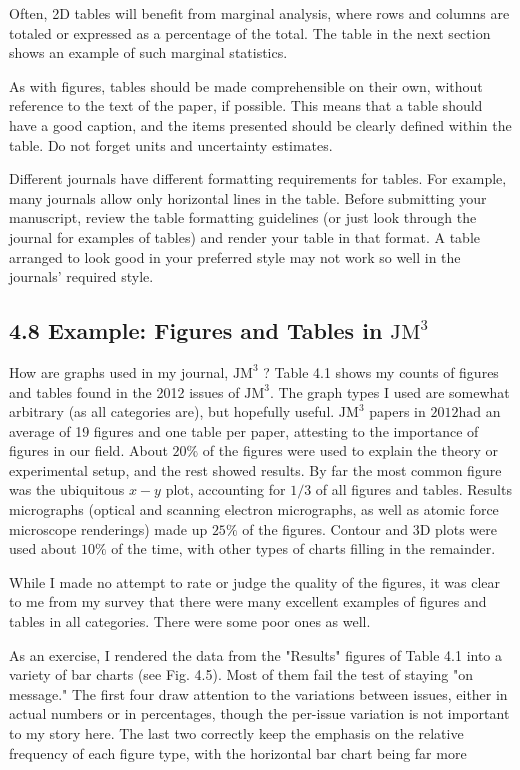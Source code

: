 Often, 2D tables will benefit from marginal analysis, where rows and columns are totaled or expressed as a percentage of the total. The table in the next section shows an example of such marginal statistics.

As with figures, tables should be made comprehensible on their own, without reference to the text of the paper, if possible. This means that a table should have a good caption, and the items presented should be clearly defined within the table. Do not forget units and uncertainty estimates.

Different journals have different formatting requirements for tables. For example, many journals allow only horizontal lines in the table. Before submitting your manuscript, review the table formatting guidelines (or just look through the journal for examples of tables) and render your table in that format. A table arranged to look good in your preferred style may not work so well in the journals' required style.

\subsection*{4.8 Example: Figures and Tables in $\mathrm{JM}^{3}$}
How are graphs used in my journal, $\mathrm{JM}^{3}$ ? Table 4.1 shows my counts of figures and tables found in the 2012 issues of $\mathrm{JM}^{3}$. The graph types I used are somewhat arbitrary (as all categories are), but hopefully useful. $\mathrm{JM}^{3}$ papers in $2012 \mathrm{had}$ an average of 19 figures and one table per paper, attesting to the importance of figures in our field. About $20 \%$ of the figures were used to explain the theory or experimental setup, and the rest showed results. By far the most common figure was the ubiquitous $x-y$ plot, accounting for $1 / 3$ of all figures and tables. Results micrographs (optical and scanning electron micrographs, as well as atomic force microscope renderings) made up $25 \%$ of the figures. Contour and 3D plots were used about $10 \%$ of the time, with other types of charts filling in the remainder.

While I made no attempt to rate or judge the quality of the figures, it was clear to me from my survey that there were many excellent examples of figures and tables in all categories. There were some poor ones as well.

As an exercise, I rendered the data from the "Results" figures of Table 4.1 into a variety of bar charts (see Fig. 4.5). Most of them fail the test of staying "on message." The first four draw attention to the variations between issues, either in actual numbers or in percentages, though the per-issue variation is not important to my story here. The last two correctly keep the emphasis on the relative frequency of each figure type, with the horizontal bar chart being far more

